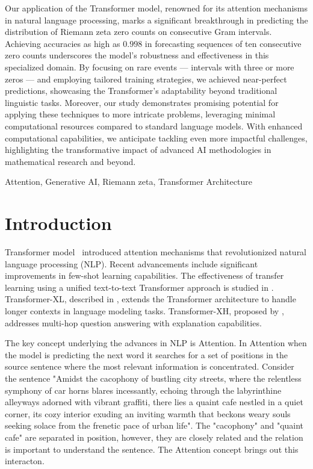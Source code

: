 \documentclass[journal]{IEEEtai}
\begin{document}
\begin{IEEEImpStatement}
Our application of the Transformer model, renowned for its attention mechanisms in natural language processing, marks a significant breakthrough in predicting the distribution of Riemann zeta zero counts on consecutive Gram intervals. Achieving accuracies as high as $0.998$ in forecasting sequences of ten consecutive zero counts underscores the model's robustness and effectiveness in this specialized domain. By focusing on rare events — intervals with three or more zeros — and employing tailored training strategies, we achieved near-perfect predictions, showcasing the Transformer's adaptability beyond traditional linguistic tasks. Moreover, our study demonstrates promising potential for applying these techniques to more intricate problems, leveraging minimal computational resources compared to standard language models. With enhanced computational capabilities, we anticipate tackling even more impactful challenges, highlighting the transformative impact of advanced AI methodologies in mathematical research and beyond.

\end{IEEEImpStatement}

\begin{IEEEkeywords}
Attention, Generative AI, Riemann zeta, Transformer Architecture
\end{IEEEkeywords}



\section{Introduction}

  Transformer model~\cite{vaswani2017attention} introduced attention mechanisms that revolutionized natural language processing (NLP).
Recent advancements \cite{radford2019language,brown2020language} include significant improvements in few-shot learning capabilities.
The effectiveness of transfer learning using a unified text-to-text Transformer approach is studied in \cite{raffel2019exploring}.
Transformer-XL, described in \cite{dai2019transformerxl}, extends the Transformer architecture to handle longer contexts in language modeling tasks.
Transformer-XH, proposed by \cite{zhang2019transformerxh}, addresses multi-hop question answering with explanation capabilities. 

The key concept underlying the advances in NLP is Attention. In Attention when the model is predicting the next word it searches for a set of positions in the source sentence where the most relevant information is concentrated. 
Consider the sentence "Amidst the cacophony of bustling city streets, where the relentless symphony of car horns blares incessantly, echoing through the labyrinthine alleyways adorned with vibrant graffiti, there lies a quaint cafe nestled in a quiet corner, its cozy interior exuding an inviting warmth that beckons weary souls seeking solace from the frenetic pace of urban life". The "cacophony" and "quaint cafe" are separated in position, however, they are closely related and the relation is important to understand the sentence. The Attention concept brings out this interacton.
\end{document}
